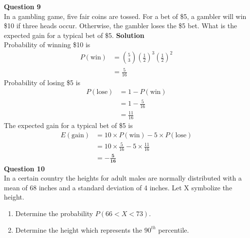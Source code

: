 \documentclass{uofa-eng-assignment}
\begin{document}
\begin{enumerate}
        \textbf{Question 9} \\
        In a gambling game, five fair coins are tossed. For a bet of \$5, a gambler will win \$10 if three
        heads occur. Otherwise, the gambler loses the \$5 bet. What is the expected gain for a typical
        bet of \$5.
        \textbf{Solution} \\
        Probability of winning \$10 is
        \begin{align*}
            P(\text{win}) & = \binom{5}{3} \left(\frac{1}{2}\right)^3 \left(\frac{1}{2}\right)^2 \\
                          & = \frac{5}{16}
        \end{align*}
        Probability of losing \$5 is
        \begin{align*}
            P(\text{lose}) & = 1 - P(\text{win}) \\
                           & = 1 - \frac{5}{16}  \\
                           & = \frac{11}{16}
        \end{align*}
        The expected gain for a typical bet of \$5 is
        \begin{align*}
            E(\text{gain}) & = 10 \times P(\text{win}) - 5 \times P(\text{lose}) \\
                           & = 10 \times \frac{5}{16} - 5 \times \frac{11}{16}   \\
                           & = \boldsymbol{-\frac{5}{16}}
        \end{align*}
        \textbf{Question 10} \\
        In a certain country the heights for adult males are normally distributed with a mean of 68 inches
        and a standard deviation of 4 inches. Let X symbolize the height.
        \begin{enumerate}
            \item Determine the probability $P(66 < X < 73)$.
            \item Determine the height which represents the $90^{th}$ percentile.

\end{enumerate}
\end{enumerate}
\end{document}
